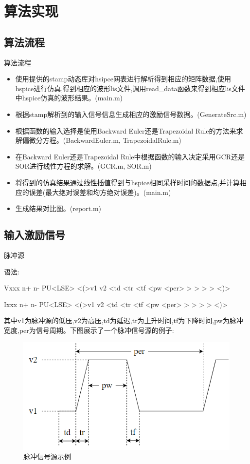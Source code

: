 \documentclass[12pt]{article}
\begin{document}
\begin{sloppypar}
\section{算法实现}

\subsection{算法流程}
\qquad 算法流程
\begin{itemize}
  \item 使用提供的stamp动态库对hsipce网表进行解析得到相应的矩阵数据,使用hspice进行仿真,得到相应的波形lis文件,调用read\_data函数来得到相应lis文件中hspice仿真的波形结果。(main.m)
  \item 根据stamp解析到的输入信号信息生成相应的激励信号数据。(GenerateSrc.m)
  \item 根据函数的输入选择是使用Backward Euler还是Trapezoidal Rule的方法来求解偏微分方程。(BackwardEuler.m, TrapezoidalRule.m)
  \item 在Backward Euler还是Trapezoidal Rule中根据函数的输入决定采用GCR还是SOR进行线性方程的求解。(GCR.m, SOR.m)
  \item 将得到的仿真结果通过线性插值得到与hspice相同采样时间的数据点,并计算相应的误差(最大绝对误差和均方绝对误差)。(main.m)
  \item 生成结果对比图。(report.m)
\end{itemize}


\subsection{输入激励信号}
\qquad 脉冲源

\qquad 语法:

\qquad Vxxx n+ n- PU<LSE> <(>v1 v2 <td <tr <tf <pw <per> > > > > <)>

\qquad Ixxx n+ n- PU<LSE> <(>v1 v2 <td <tr <tf <pw <per> > > > > <)>

\qquad 其中v1为脉冲源的低压,v2为高压,td为延迟,tr为上升时间,tf为下降时间,pw为脉冲宽度,per为信号周期。下图展示了一个脉冲信号源的例子:

\begin{figure}[H]
  \centering
  \includegraphics[width=0.5\columnwidth]{figure/pulse.png}
  \caption{脉冲信号源示例}
\end{figure}


\end{sloppypar}
\end{document}

